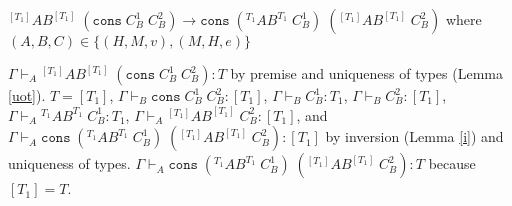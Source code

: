 \begin{case}
$^{[T_{1}]}AB^{[T_{1}]}\;(\mathtt{cons}\;C_{B}^{1}\;C_{B}^{2})\rightarrow\mathtt{cons}\;(^{T_{1}}AB^{T_{1}}\;C_{B}^{1})\;(^{[T_{1}]}AB^{[T_{1}]}\;C_{B}^{2})$ where $(A,B,C)\in\lbrace(H,M,v),(M,H,e)\rbrace$

$\Gamma\vdash_{A}{^{[T_{1}]}A}B^{[T_{1}]}\;(\mathtt{cons}\;C_{B}^{1}\;C_{B}^{2}):T$ by premise and uniqueness of types (Lemma \ref{uot}).  $T=[T_{1}]$, $\Gamma\vdash_{B}\mathtt{cons}\;C_{B}^{1}\;C_{B}^{2}:[T_{1}]$, $\Gamma\vdash_{B}C_{B}^{1}:T_{1}$, $\Gamma\vdash_{B}C_{B}^{2}:[T_{1}]$, $\Gamma\vdash_{A}{^{T_{1}}A}B^{T_{1}}\;C_{B}^{1}:T_{1}$, $\Gamma\vdash_{A}{^{[T_{1}]}A}B^{[T_{1}]}\;C_{B}^{2}:[T_{1}]$, and $\Gamma\vdash_{A}\mathtt{cons}\;(^{T_{1}}AB^{T_{1}}\;C_{B}^{1})\;(^{[T_{1}]}AB^{[T_{1}]}\;C_{B}^{2}):[T_{1}]$ by inversion (Lemma \ref{i}) and uniqueness of types.  $\Gamma\vdash_{A}\mathtt{cons}\;(^{T_{1}}AB^{T_{1}}\;C_{B}^{1})\;(^{[T_{1}]}AB^{[T_{1}]}\;C_{B}^{2}):T$ because $[T_{1}]=T$.
\end{case}